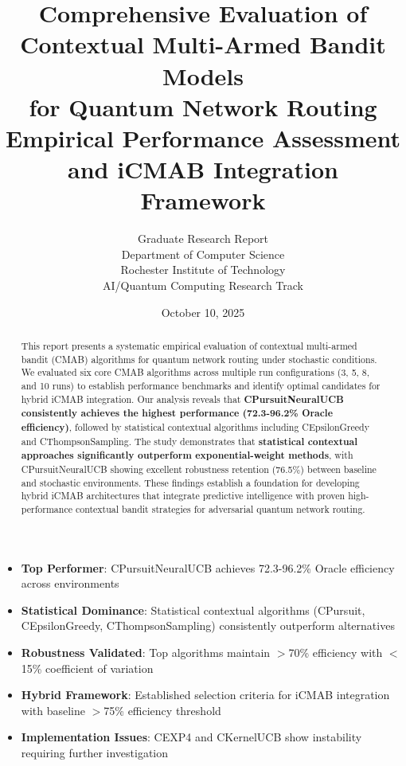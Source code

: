 \documentclass[12pt,a4paper]{article}
\title{\textbf{Comprehensive Evaluation of Contextual Multi-Armed Bandit Models\\for Quantum Network Routing}\\
\large{Empirical Performance Assessment and iCMAB Integration Framework}}
\author{Graduate Research Report\\
Department of Computer Science\\
Rochester Institute of Technology\\
AI/Quantum Computing Research Track}
\date{October 10, 2025}
\newcommand{\primarytext}[1]{\textcolor{primaryblue}{\textbf{#1}}}
\newcommand{\secondarytext}[1]{\textcolor{secondaryblue}{\textbf{#1}}}
\newcommand{\success}[1]{\textcolor{accentgreen}{\textbf{#1}}}
\newcommand{\warning}[1]{\textcolor{warningred}{\textbf{#1}}}
\begin{document}
\maketitle

\begin{abstract}
This report presents a systematic empirical evaluation of contextual multi-armed bandit (CMAB) algorithms for quantum network routing under stochastic conditions. We evaluated six core CMAB algorithms across multiple run configurations (3, 5, 8, and 10 runs) to establish performance benchmarks and identify optimal candidates for hybrid iCMAB integration. Our analysis reveals that \primarytext{CPursuitNeuralUCB consistently achieves the highest performance (72.3-96.2\% Oracle efficiency)}, followed by statistical contextual algorithms including CEpsilonGreedy and CThompsonSampling. The study demonstrates that \success{statistical contextual approaches significantly outperform exponential-weight methods}, with CPursuitNeuralUCB showing excellent robustness retention (76.5\%) between baseline and stochastic environments. These findings establish a foundation for developing hybrid iCMAB architectures that integrate predictive intelligence with proven high-performance contextual bandit strategies for adversarial quantum network routing.
\end{abstract}

\newpage
\vspace{0.5cm}
\tableofcontents

\newpage

\begin{tcolorbox}[colback=highlightgray,colframe=primaryblue,title=\textbf{Executive Summary - Key Findings}]
\begin{itemize}
\item \primarytext{Top Performer}: CPursuitNeuralUCB achieves 72.3-96.2\% Oracle efficiency across environments
\item \secondarytext{Statistical Dominance}: Statistical contextual algorithms (CPursuit, CEpsilonGreedy, CThompsonSampling) consistently outperform alternatives
\item \success{Robustness Validated}: Top algorithms maintain $>$70\% efficiency with $<$15\% coefficient of variation
\item \primarytext{Hybrid Framework}: Established selection criteria for iCMAB integration with baseline $>$75\% efficiency threshold
\item \warning{Implementation Issues}: CEXP4 and CKernelUCB show instability requiring further investigation
\end{itemize}
\end{tcolorbox}
\end{document}
